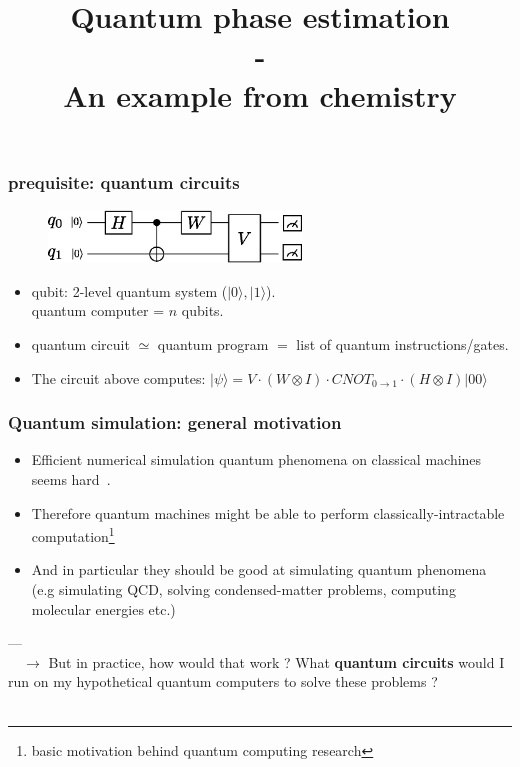 \documentclass{beamer}
\title{Quantum phase estimation \\-\\ An example from chemistry}
\begin{document}
\frame{\titlepage}


\begin{frame}
\frametitle{prequisite: quantum circuits}

\begin{center}
\begin{figure}
\includegraphics[width=0.6\textwidth]{quantum_circuit_example.eps}
\end{figure}
\end{center}
\begin{itemize}
\item qubit: 2-level quantum system ($|0\rangle, |1\rangle$). \\ quantum computer = $n$ qubits.
\item quantum circuit $\simeq$ quantum program $=$ list of quantum instructions/gates.
\item The circuit above computes: $|\psi\rangle = V \cdot (W\otimes I) \cdot CNOT_{0\rightarrow 1} \cdot (H\otimes I) |00\rangle$
\end{itemize}

 
\end{frame}

\begin{frame}
\frametitle{Quantum simulation: general motivation}

\begin{itemize}
\item Efficient numerical simulation quantum phenomena on classical machines seems hard~\textcolor{blue}{\cite{feynman1982simulating}}.
\item Therefore quantum machines might be able to perform classically-intractable computation\footnote{basic motivation behind quantum computing research}
\item And in particular they should be good at simulating quantum phenomena (e.g simulating QCD, solving condensed-matter problems, computing molecular energies etc.) 
\end{itemize}
---\\
$\quad\rightarrow$ But in practice, how would that work ? What \textbf{quantum circuits} would I run on my hypothetical
quantum computers to solve these problems ?\\~\\

\end{frame}
\end{document}
